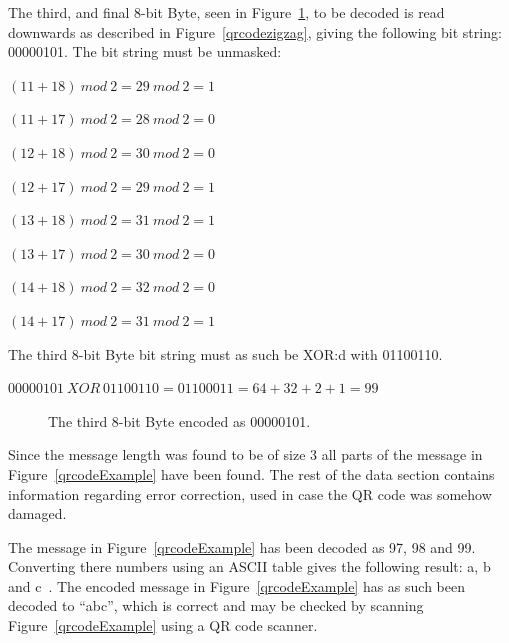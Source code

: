 The third, and final 8-bit Byte, seen in Figure~\ref{qrcodeExampleStep8}, to be decoded is read downwards as described in Figure~\ref{qrcodezigzag}, giving the following bit string: 00000101. The bit string must be unmasked:

\begin{center}

\((11+18)~mod~2=29~mod~2=1\)

\((11+17)~mod~2=28~mod~2=0\)

\((12+18)~mod~2=30~mod~2=0\)

\((12+17)~mod~2=29~mod~2=1\)

\((13+18)~mod~2=31~mod~2=1\) 

\((13+17)~mod~2=30~mod~2=0\)

\((14+18)~mod~2=32~mod~2=0\)

\((14+17)~mod~2=31~mod~2=1\)

\end{center}

The third 8-bit Byte bit string must as such be XOR:d with 01100110.

\begin{center}
\(00000101~XOR~01100110 = 01100011 = 64 + 32 + 2 + 1 = 99\)
\end{center}

	\begin{figure}[H]%
		\centering
		\caption{The third 8-bit Byte encoded as 00000101.}
		\label{qrcodeExampleStep8}
	\end{figure}

Since the message length was found to be of size 3 all parts of the message in Figure~\ref{qrcodeExample} have been found. The rest of the data section contains information regarding error correction, used in case the QR code was somehow damaged.

The message in Figure~\ref{qrcodeExample} has been decoded as 97, 98 and 99. Converting there numbers using an ASCII table gives the following result: a, b and c~\cite{asciitable}. The encoded message in Figure~\ref{qrcodeExample} has as such been decoded to ``abc'', which is correct and may be checked by scanning Figure~\ref{qrcodeExample} using a QR code scanner.

